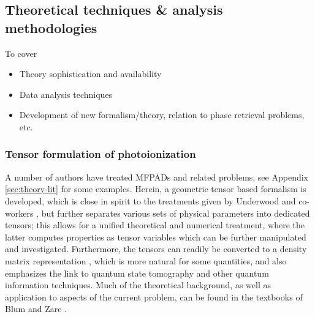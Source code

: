 \subsection{Theoretical techniques \& analysis methodologies}

To cover 

\begin{itemize}
\item Theory sophistication and availability
\item Data analysis techniques
\item Development of new formalism/theory, relation to phase retrieval problems, etc.
\end{itemize}

\subsubsection{Tensor formulation of photoionization}

A number of authors have treated MFPADs and related problems, see Appendix \ref{sec:theory-lit} for some examples. Herein, a geometric tensor based formalism is developed, which is close in spirit to the treatments given by Underwood and co-workers \cite{Reid2000,Stolow2008,Underwood2000}, but further separates various sets of physical parameters into dedicated tensors; this allows for a unified theoretical and numerical treatment, where the latter computes properties as tensor variables which can be further manipulated and investigated.%
Furthermore, the tensors can readily be converted to a density matrix representation \cite{BlumDensityMat,zareAngMom}, which is more natural for some quantities, and also emphasizes the link to quantum state tomography and other quantum information techniques. Much of the theoretical background, as well as application to aspects of the current problem, can be found in the textbooks of Blum \cite{BlumDensityMat} and Zare \cite{zareAngMom}.

